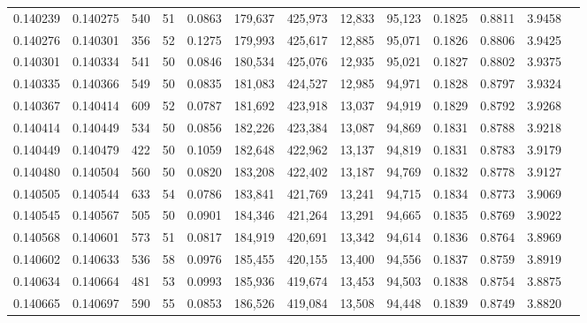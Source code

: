 \begin{tabular}{rrrrrrrrrrrrr}
0.140239 & 0.140275 &   540 &  51 &                                     0.0863 & 179,637 & 425,973 &  12,833 &  95,123 & 0.1825 & 0.8811 & 3.9458 \\
0.140276 & 0.140301 &   356 &  52 &                                     0.1275 & 179,993 & 425,617 &  12,885 &  95,071 & 0.1826 & 0.8806 & 3.9425 \\
0.140301 & 0.140334 &   541 &  50 &                                     0.0846 & 180,534 & 425,076 &  12,935 &  95,021 & 0.1827 & 0.8802 & 3.9375 \\
0.140335 & 0.140366 &   549 &  50 &                                     0.0835 & 181,083 & 424,527 &  12,985 &  94,971 & 0.1828 & 0.8797 & 3.9324 \\
0.140367 & 0.140414 &   609 &  52 &                                     0.0787 & 181,692 & 423,918 &  13,037 &  94,919 & 0.1829 & 0.8792 & 3.9268 \\
0.140414 & 0.140449 &   534 &  50 &                                     0.0856 & 182,226 & 423,384 &  13,087 &  94,869 & 0.1831 & 0.8788 & 3.9218 \\
0.140449 & 0.140479 &   422 &  50 &                                     0.1059 & 182,648 & 422,962 &  13,137 &  94,819 & 0.1831 & 0.8783 & 3.9179 \\
0.140480 & 0.140504 &   560 &  50 &                                     0.0820 & 183,208 & 422,402 &  13,187 &  94,769 & 0.1832 & 0.8778 & 3.9127 \\
0.140505 & 0.140544 &   633 &  54 &                                     0.0786 & 183,841 & 421,769 &  13,241 &  94,715 & 0.1834 & 0.8773 & 3.9069 \\
0.140545 & 0.140567 &   505 &  50 &                                     0.0901 & 184,346 & 421,264 &  13,291 &  94,665 & 0.1835 & 0.8769 & 3.9022 \\
0.140568 & 0.140601 &   573 &  51 &                                     0.0817 & 184,919 & 420,691 &  13,342 &  94,614 & 0.1836 & 0.8764 & 3.8969 \\
0.140602 & 0.140633 &   536 &  58 &                                     0.0976 & 185,455 & 420,155 &  13,400 &  94,556 & 0.1837 & 0.8759 & 3.8919 \\
0.140634 & 0.140664 &   481 &  53 &                                     0.0993 & 185,936 & 419,674 &  13,453 &  94,503 & 0.1838 & 0.8754 & 3.8875 \\
0.140665 & 0.140697 &   590 &  55 &                                     0.0853 & 186,526 & 419,084 &  13,508 &  94,448 & 0.1839 & 0.8749 & 3.8820 \\

\end{tabular}
